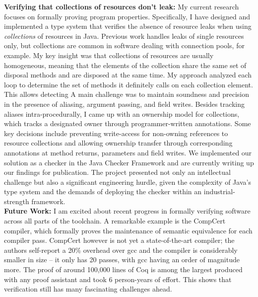 \documentclass{article}
\newcommand{\todo}[1]{{\color{red}\bfseries [[#1]]}}
\renewcommand{\todo}[1]{\relax}
\begin{document}
\textbf{Verifying that collections of resources don't leak:} My current research focuses on formally proving program properties. Specifically, I have designed and implemented a type system that verifies the absence of resource leaks when using \emph{collections} of resources in Java.
Previous work handles leaks of single resources only, but collections are common in software dealing with connection pools, for example.
My key insight was that collections of resources are usually homogeneous, meaning that the elements of the collection share the same set of disposal methods and are disposed at the same time. My approach analyzed each loop to determine the set of methods it definitely calls on each collection element. 
\todo{Sentence fragment:}This allows detecting
A main challenge was to maintain soundness and precision in the presence of aliasing, argument passing, and field writes. Besides tracking aliases intra-procedurally, I came up with an ownership model for collections, which tracks a designated owner through programmer-written annotations. Some key decisions include preventing write-access for non-owning references to resource collections and allowing ownership transfer through corresponding annotations at method returns, parameters and field writes.
We implemented our solution as a checker in the Java Checker Framework and are currently writing up our findings for publication. The project presented not only an intellectual challenge but also a significant engineering hurdle, given the complexity of Java's type system and the demands of deploying the checker within an industrial-strength framework.\\

\textbf{Future Work:}
I am excited about recent progress in formally verifying software across all parts of the toolchain. A remarkable example is the CompCert compiler, which formally proves the maintenance of semantic equivalence for each compiler pass. CompCert however is not yet a state-of-the-art compiler; the authors self-report a 20\% overhead over gcc and the compiler is considerably smaller in size -- it only has 20 passes, with gcc having an order of magnitude more. The proof of around 100,000 lines of Coq is among the largest produced with any proof assistant and took 6 person-years of effort. This shows that verification still has many fascinating challenges ahead.
\end{document}
